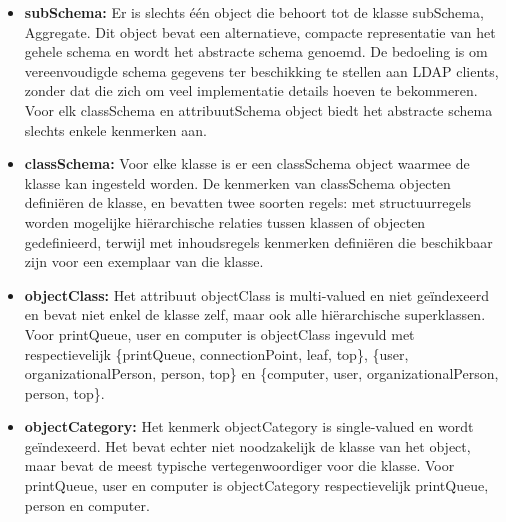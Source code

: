 \begin{enumerate}
		 {
			\begin{itemize}
				\item \textbf{subSchema:} Er is slechts één object die behoort tot de klasse subSchema, Aggregate. Dit object bevat een alternatieve, compacte representatie van het gehele schema en wordt het abstracte schema genoemd. De bedoeling is om vereenvoudigde schema gegevens ter beschikking te stellen aan LDAP clients, zonder dat die zich om veel implementatie details hoeven te bekommeren. Voor elk classSchema en attribuutSchema object biedt het abstracte schema slechts enkele kenmerken aan. 
				\item \textbf{classSchema:} Voor elke klasse is er een classSchema object waarmee de klasse kan ingesteld worden. De kenmerken van classSchema objecten definiëren de klasse, en bevatten twee soorten regels: met structuurregels worden mogelijke hiërarchische relaties tussen klassen of objecten gedefinieerd, terwijl met inhoudsregels kenmerken definiëren die beschikbaar zijn voor een exemplaar van die klasse.
			\end{itemize}
		}
		
		 { 
			\begin{itemize}
				\item \textbf{objectClass:} Het attribuut objectClass is multi-valued en niet geïndexeerd en bevat niet enkel de klasse zelf, maar ook alle hiërarchische superklassen. Voor printQueue, user en computer is objectClass ingevuld met respectievelijk \{printQueue, connectionPoint, leaf, top\}, \{user, organizationalPerson, person, top\} en \{computer, user, organizationalPerson, person, top\}. 
				\item  \textbf{objectCategory:} Het kenmerk objectCategory is single-valued en wordt geïndexeerd. Het bevat echter niet noodzakelijk de klasse van het object, maar bevat de meest typische vertegenwoordiger voor die klasse. Voor printQueue, user en computer is objectCategory respectievelijk printQueue, person en computer.
			\end{itemize}	
		
}
\end{enumerate}

